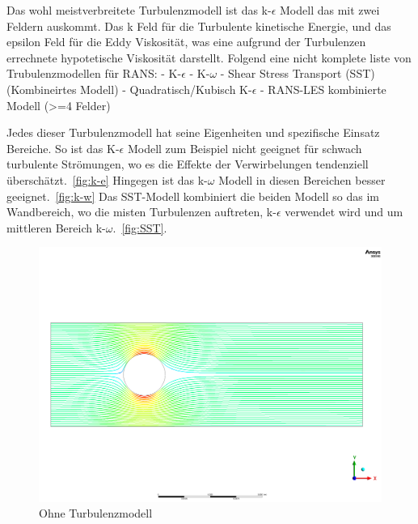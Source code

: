 \begin{refsection}
Das wohl meistverbreitete Turbulenzmodell ist das k-$\epsilon$ Modell das mit zwei Feldern auskommt. Das k Feld für die Turbulente kinetische Energie,
und das epsilon Feld für die Eddy Viskosität, was eine aufgrund der Turbulenzen errechnete hypotetische Viskosität darstellt.
Folgend eine nicht komplete liste von Trubulenzmodellen für RANS:
-	K-$\epsilon$
-	K-$\omega$
-	Shear Stress Transport (SST) (Kombineirtes Modell)
-	Quadratisch/Kubisch K-$\epsilon$
-	RANS-LES kombinierte Modell (>=4 Felder)

Jedes dieser Turbulenzmodell hat seine Eigenheiten und spezifische Einsatz Bereiche.
So ist das K-$\epsilon$ Modell zum Beispiel nicht geeignet für schwach turbulente Strömungen,
wo es die Effekte der Verwirbelungen tendenziell überschätzt.~\ref{fig:k-e}
Hingegen ist das k-$\omega$ Modell in diesen Bereichen besser geeignet.~\ref{fig:k-w}
Das SST-Modell kombiniert die beiden Modell so das im Wandbereich,
wo die misten Turbulenzen auftreten, k-$\epsilon$ verwendet wird und um mittleren Bereich k-$\omega$.~\ref{fig:SST}.

\begin{figure}
    \includegraphics[width=\textwidth]{papers/reynolds/images/dns.png}
    \caption{Ohne Turbulenzmodell}
    \label{fig:DNS}
\end{figure}


\end{refsection}
